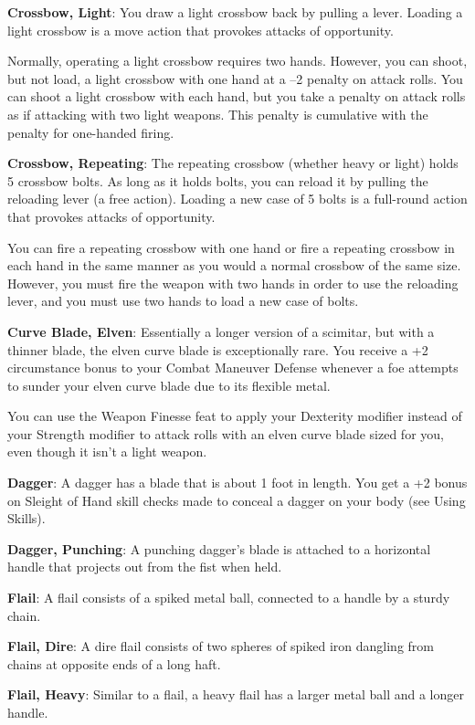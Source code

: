 \textbf{Crossbow, Light}: You draw a light crossbow back by pulling a lever. Loading a light crossbow is a move action that provokes attacks of opportunity.
		
Normally, operating a light crossbow requires two hands. However, you can shoot, but not load, a light crossbow with one hand at a --2 penalty on attack rolls. You can shoot a light crossbow with each hand, but you take a penalty on attack rolls as if attacking with two light weapons. This penalty is cumulative with the penalty for one-handed firing.
		
\textbf{Crossbow, Repeating}: The repeating crossbow (whether heavy or light) holds 5 crossbow bolts. As long as it holds bolts, you can reload it by pulling the reloading lever (a free action). Loading a new case of 5 bolts is a full-round action that provokes attacks of opportunity.
		
You can fire a repeating crossbow with one hand or fire a repeating crossbow in each hand in the same manner as you would a normal crossbow of the same size. However, you must fire the weapon with two hands in order to use the reloading lever, and you must use two hands to load a new case of bolts.
		
\textbf{Curve Blade, Elven}: Essentially a longer version of a scimitar, but with a thinner blade, the elven curve blade is exceptionally rare. You receive a +2 circumstance bonus to your Combat Maneuver Defense whenever a foe attempts to sunder your elven curve blade due to its flexible metal.
		
You can use the Weapon Finesse feat to apply your Dexterity modifier instead of your Strength modifier to attack rolls with an elven curve blade sized for you, even though it isn't a light weapon.
		
\textbf{Dagger}: A dagger has a blade that is about 1 foot in length. You get a +2 bonus on Sleight of Hand skill checks made to conceal a dagger on your body (see Using Skills).
		
\textbf{Dagger, Punching}: A punching dagger's blade is attached to a horizontal handle that projects out from the fist when held.
		
\textbf{Flail}: A flail consists of a spiked metal ball, connected to a handle by a sturdy chain.
		
\textbf{Flail, Dire}: A dire flail consists of two spheres of spiked iron dangling from chains at opposite ends of a long haft.
		
\textbf{Flail, Heavy}: Similar to a flail, a heavy flail has a larger metal ball and a longer handle. 
		
